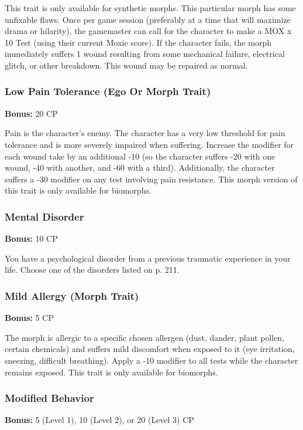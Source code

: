 This trait is only available for synthetic morphs.  This particular morph has
some unfixable flaws. Once per game session (preferably at a time that will
maximize drama or hilarity), the gamemaster can call for the character to
make a MOX x 10 Test (using their current Moxie score). If the character fails,
the morph immediately suffers 1 wound resulting from some mechanical failure,
electrical glitch, or other breakdown.  This wound may be repaired as normal.

\subsubsection{Low Pain Tolerance (Ego Or Morph Trait)}
\textbf{Bonus:} 20 CP

Pain is the character’s enemy. The character has a very low threshold for pain
tolerance and is more severely impaired when suffering. Increase the modifier
for each wound take by an additional -10 (so the character suffers -20 with one
wound, -40 with another, and -60 with a third). Additionally, the character
suffers a -30 modifier on any test involving pain resistance. This morph
version of this trait is only available for biomorphs.

\subsubsection{Mental Disorder}
\textbf{Bonus:} 10 CP

You have a psychological disorder from a previous traumatic experience in your
life. Choose one of the disorders listed on p. 211.

\subsubsection{Mild Allergy (Morph Trait)}
\textbf{Bonus:} 5 CP

The morph is allergic to a specific chosen allergen (dust, dander, plant
pollen, certain chemicals) and suffers mild discomfort when exposed to it
(eye irritation, sneezing, difficult breathing). Apply a -10 modifier to all
tests while the character remains exposed. This trait is only available for
biomorphs.

\subsubsection{Modified Behavior}
\textbf{Bonus:} 5 (Level 1), 10 (Level 2), or 20 (Level 3) CP

